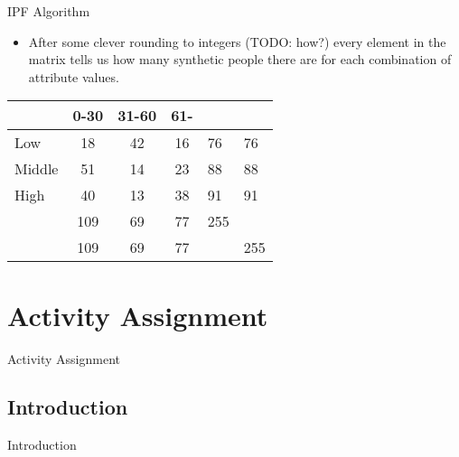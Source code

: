 \documentclass{beamer}
\begin{document}
\begin{frame}{IPF Algorithm}
\begin{itemize}
\item After some clever rounding to integers (TODO: how?) every
  element in the matrix tells us how many synthetic people there are
  for each combination of attribute values.
\end{itemize}

\begin{table}
\centering
\begin{tabular}{l||c c c||l|l}
         &  0-30 & 31-60 & 61-   & \sumact{} & \sumreq{}\\
\hline \hline
Low      &  18   &  42   &  16   & 76 & 76 \\
Middle   &  51   &  14   &  23   & 88 & 88 \\
High     &  40   &  13   &  38   & 91 & 91 \\
\hline \hline
\sumact{}& 109   &  69   &  77   & 255 & \\
\hline
\sumreq{}& 109   &  69   &  77   & & 255 \\
\end{tabular}
\end{table}
\end{frame}


\section{Activity Assignment}
\begin{frame}
  \centering
  \LARGE
  Activity Assignment
\end{frame}


\subsection{Introduction}
\begin{frame}{Introduction}
\end{frame}
\end{document}
